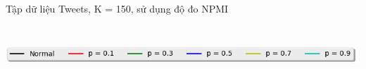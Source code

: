 \documentclass[pdf]{beamer}
\begin{document}
\begin{frame}{Tập dữ liệu Tweets, K = 150, sử dụng độ đo NPMI }
\begin{columns}[T] %
	\begin{column}{.50\textwidth}
		\begin{figure}
		\end{figure}
	\end{column} %
	\hfill%
	\begin{column}{.50\textwidth}
		\begin{figure}
		\end{figure}				
	\end{column} %
\end{columns}
\begin{center}
	\includegraphics[width=1\textwidth]{menu.png}	
\end{center}
\end{frame}
\end{document}
